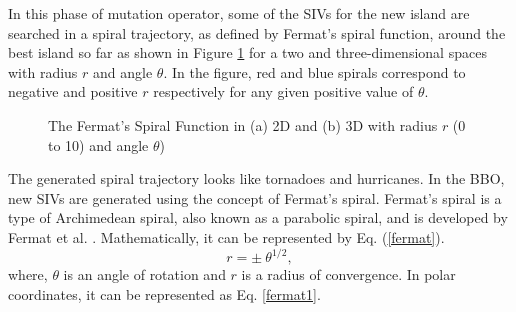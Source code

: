 In this phase of mutation operator, some of the SIVs for the new island are searched in a spiral trajectory, as defined by Fermat's spiral function, around the best island so far as shown in Figure \ref{fig:sp} for a two and three-dimensional spaces with radius $r$ and angle $\theta$. In the figure, red and blue spirals correspond to negative and positive $r$ respectively for any given positive value of $\theta$.
\begin{figure}
\centering

      \hspace{1mm}

  \caption[The Fermat's Spiral Function in 2D and 3D with radius $r$ (0 to 10) angle $\theta$]{\fontsize{10pt}{12pt}\selectfont The Fermat's Spiral Function in (a) 2D and (b) 3D with radius $r$ (0 to 10) and angle $\theta$) }\label{fig:sp}
\end{figure}
The generated spiral trajectory looks like tornadoes and hurricanes. In the BBO, new SIVs are generated using the concept of Fermat's spiral.  Fermat's spiral is a type of Archimedean spiral, also known as a parabolic spiral, and is developed by Fermat et al. \cite{mahoney1994}. Mathematically, it can be  represented by Eq. (\ref{fermat}).
\begin{equation}\label{fermat}
r=\pm\ \theta ^{1/2},
\end{equation}
where, $\theta$ is an angle of rotation and $r$ is a radius of convergence. In polar coordinates, it can be represented as Eq. \ref{fermat1}.
